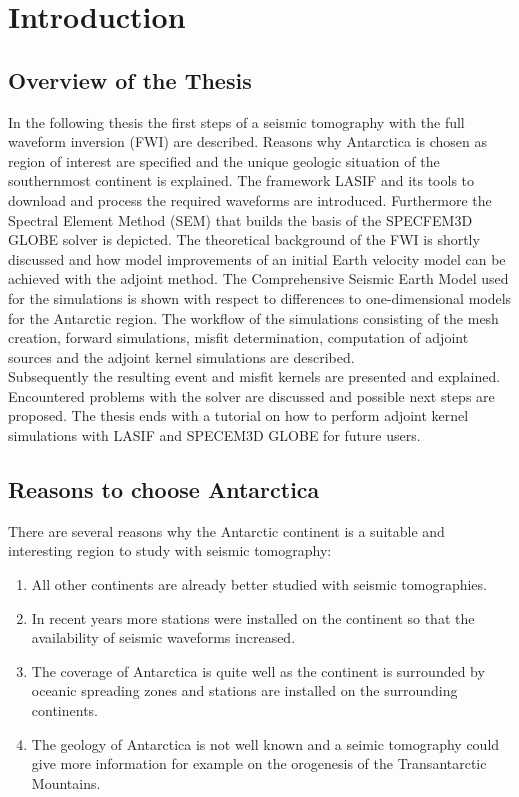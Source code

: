 

\chapter{Introduction}

\section{Overview of the Thesis}
In the following thesis the first steps of a seismic tomography with the full waveform inversion
(FWI) 
are described.
Reasons why Antarctica is chosen as region of interest are specified and the unique geologic 
situation of the southernmost continent is explained.
The framework LASIF and its tools to download and process the required 
waveforms are introduced.
Furthermore the Spectral Element Method (SEM) that builds the basis of the SPECFEM3D GLOBE 
solver is depicted.
The theoretical background of the FWI is shortly discussed and how model improvements 
of an initial Earth velocity model can be achieved with the adjoint method.
The Comprehensive Seismic Earth Model used for the simulations is shown with
respect to differences to one-dimensional models for the Antarctic region.
The workflow of the simulations consisting of the mesh creation, forward simulations, 
misfit determination, computation of adjoint sources and the adjoint kernel simulations
are described.\\
Subsequently the resulting event and misfit kernels are presented and explained.
Encountered problems with the solver are discussed and possible next steps are proposed.
The thesis ends with a tutorial on how to perform adjoint kernel simulations
with LASIF and SPECEM3D GLOBE for future users.

\section{Reasons to choose Antarctica}

There are several reasons why the Antarctic continent is a suitable and interesting region 
to study with seismic tomography:
\begin{enumerate}[i]
\item All other continents are already better studied with seismic tomographies.
\item In recent years more stations were installed on the continent so that the availability 
of seismic waveforms increased.
\item The coverage of Antarctica is quite well as the continent is surrounded by oceanic spreading zones 
and stations are installed on the surrounding continents.
\item The geology of Antarctica is not well known and a seimic tomography could give more information
for example on the orogenesis of the Transantarctic Mountains.
\end{enumerate}


